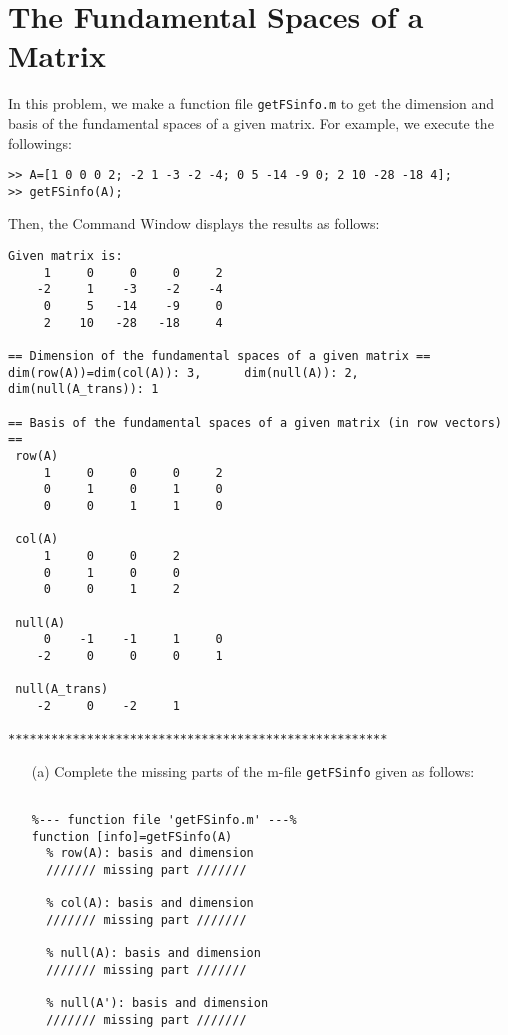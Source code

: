 \section{The Fundamental Spaces of a Matrix}


\begin{exer}\label{ex1}
In this problem, we make a function file \verb"getFSinfo.m" to get the dimension and basis of the fundamental spaces of a given matrix. For example, we execute the followings:
\begin{verbatim}
>> A=[1 0 0 0 2; -2 1 -3 -2 -4; 0 5 -14 -9 0; 2 10 -28 -18 4];
>> getFSinfo(A);
\end{verbatim}
Then, the Command Window displays the results as follows:
\begin{verbatim}
Given matrix is:
     1     0     0     0     2
    -2     1    -3    -2    -4
     0     5   -14    -9     0
     2    10   -28   -18     4

== Dimension of the fundamental spaces of a given matrix ==
dim(row(A))=dim(col(A)): 3, 	 dim(null(A)): 2, 	 dim(null(A_trans)): 1

== Basis of the fundamental spaces of a given matrix (in row vectors) ==
 row(A)
     1     0     0     0     2
     0     1     0     1     0
     0     0     1     1     0

 col(A)
     1     0     0     2
     0     1     0     0
     0     0     1     2

 null(A)
     0    -1    -1     1     0
    -2     0     0     0     1

 null(A_trans)
    -2     0    -2     1

*****************************************************
\end{verbatim}
\begin{enumerate}
\item[(a)] Complete the missing parts of the m-file \verb"getFSinfo" given as follows:
\begingroup
    \fontsize{10pt}{12pt}\selectfont
\begin{verbatim}

%--- function file 'getFSinfo.m' ---%
function [info]=getFSinfo(A)
  % row(A): basis and dimension
  /////// missing part ///////

  % col(A): basis and dimension
  /////// missing part ///////

  % null(A): basis and dimension
  /////// missing part ///////

  % null(A'): basis and dimension
  /////// missing part ///////


\end{verbatim}
\end{enumerate}
\end{exer}
